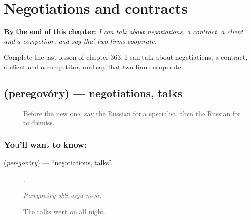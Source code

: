 
\chapter{Negotiations and contracts}
\label{ch:ru-negotiations-and-contracts}

\begin{chapteropening}
\textbf{By the end of this chapter:} \emph{I can talk about negotiations, a contract, a client and a competitor, and say that two firms cooperate.}

Complete the last lesson of chapter 363: I can talk about negotiations, a contract, a client and a competitor, and say that two firms cooperate.
\end{chapteropening}

\section[\texorpdfstring{\ru{переговоры} (peregovóry)}{переговоры (peregovóry)}]{ (peregovóry) — negotiations, talks}

\label{lesson:RU-C363-peregovory}



\begin{quote}
Before the new one: say the Russian for a specialist, then the Russian for to dismiss.
\end{quote}

\subsection*{You'll want to know: }
\textbf{} (\emph{peregovóry}) — \textquotedblleft{}negotiations, talks\textquotedblright{}.

\begin{quote}
   .
\end{quote}

\begin{quote}
\emph{Peregovóry shli vsyu noch.}
\end{quote}

\begin{quote}
The talks went on all night.
\end{quote}

